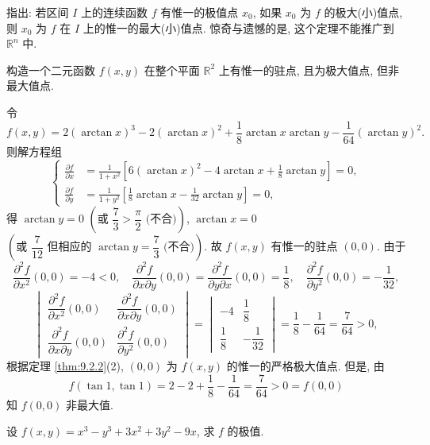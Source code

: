  指出: 若区间 $I$ 上的连续函数 $f$ 有惟一的极值点 $x_{0}$, 如果 $x_{0}$ 为 $f$ 的极大(小)值点, 则 $x_{0}$ 为 $f$ 在 $I$ 上的惟一的最大(小)值点. 惊奇与遗憾的是, 这个定理不能推广到 $\mathbb{R}^{n}$ 中.

\begin{example}\label{ex:9.2.1}
构造一个二元函数 $f(x, y)$ 在整个平面 $\mathbb{R}^{2}$ 上有惟一的驻点, 且为极大值点, 但非最大值点.
\end{example}

\begin{solution}
令
\[
  f(x, y) = 2(\arctan x)^{3} - 2(\arctan x)^{2} + \frac{1}{8}\arctan x\arctan y - \frac{1}{64}(\arctan y)^{2}.
\]
则解方程组
\[
  \left\{\begin{aligned}
    \frac{\partial f}{\partial x} &= \frac{1}{1 + x^{2}}\left[6(\arctan x)^{2} - 4\arctan x + \frac{1}{8}\arctan y\right] = 0, \\
    \frac{\partial f}{\partial y} &= \frac{1}{1 + y^{2}}\left[\frac{1}{8}\arctan x - \frac{1}{32}\arctan y\right] = 0,
  \end{aligned}\right.
\]
得 $\arctan y = 0$ $\left(\text{或 } \dfrac{7}{3} > \dfrac{\pi}{2} \text{ (不合)}\right)$, $\arctan x = 0$ $\left(\text{或 } \dfrac{7}{12} \text{ 但相应的 } \arctan y = \dfrac{7}{3} \text{ (不合)}\right)$. 故 $f(x, y)$ 有惟一的驻点 $(0, 0)$. 由于
\[
  \frac{\partial^{2}f}{\partial x^{2}}(0, 0) = -4 < 0, \quad \frac{\partial^{2}f}{\partial x\partial y}(0, 0) = \frac{\partial^{2}f}{\partial y\partial x}(0, 0) = \frac{1}{8}, \quad \frac{\partial^{2}f}{\partial y^{2}}(0, 0) = -\frac{1}{32},
\]
\[
  \begin{vmatrix}
    \dfrac{\partial^{2}f}{\partial x^{2}}(0, 0) & \dfrac{\partial^{2}f}{\partial x\partial y}(0, 0) \\
    \dfrac{\partial^{2}f}{\partial x\partial y}(0, 0) & \dfrac{\partial^{2}f}{\partial y^{2}}(0, 0)
  \end{vmatrix} = \begin{vmatrix} -4 & \dfrac{1}{8} \\ \dfrac{1}{8} & -\dfrac{1}{32} \end{vmatrix} = \frac{1}{8} - \frac{1}{64} = \frac{7}{64} > 0,
\]
根据定理 \ref{thm:9.2.2}(2), $(0, 0)$ 为 $f(x, y)$ 的惟一的严格极大值点. 但是, 由
\[
  f(\tan 1, \tan 1) = 2 - 2 + \frac{1}{8} - \frac{1}{64} = \frac{7}{64} > 0 = f(0, 0)
\]
知 $f(0, 0)$ 非最大值.
\end{solution}

\begin{example}\label{ex:9.2.2}
设 $f(x, y) = x^{3} - y^{3} + 3x^{2} + 3y^{2} - 9x$, 求 $f$ 的极值.
\end{example}

